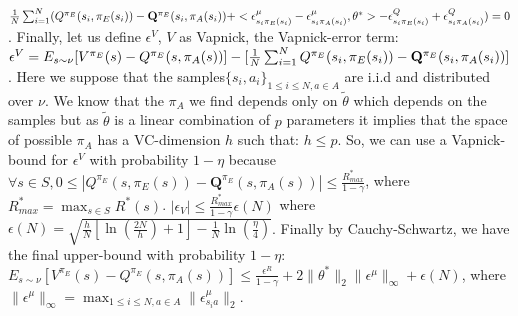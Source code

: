 \documentclass{article}
\newcommand{\Q}{\mathbf{Q}}
\begin{document}
${1\over N}\sum_{i=1}^N(Q^{\pi_E}(s_i,\pi_E(s_i))-\Q^{\pi_E}(s_i,\pi_A(s_i))+<\epsilon^{\mu}_{s_i\pi_E(s_i)}-\epsilon^{\mu}_{s_i\pi_A(s_i)},\theta^*>-\epsilon^{Q}_{s_i\pi_E(s_i)}+\epsilon^{Q}_{s_i\pi_A(s_i)})=0$. Finally, let us define $\epsilon^V$, $V$ as Vapnick, the Vapnick-error term:
$\epsilon^V=E_{s\sim\nu}[V^{\pi_E}(s)-Q^{\pi_E}(s,\pi_A(s))]-[{1\over N}\sum_{i=1}^NQ^{\pi_E}(s_i,\pi_E(s_i))-\Q^{\pi_E}(s_i,\pi_A(s_i))]$. Here we suppose that the samples$\{s_i,a_i\}_{1\leq i \leq N,a\in A}$ are i.i.d and distributed over $\nu$. We know that the $\pi_A$ we find depends only on $\tilde{\theta}$ which depends on the samples
but as $\tilde{\theta}$ is a linear combination of $p$ parameters it implies that the space of possible $\pi_A$ has a VC-dimension $h$ such that: $h\leq p$. So, we can use a Vapnick-bound for $\epsilon^V$ with probability $1-\eta$ because $\forall s\in S, 0\leq|Q^{\pi_E}(s,\pi_E(s))-\Q^{\pi_E}(s,\pi_A(s))|\leq\frac{R^*_{max}}{1-\gamma}$, where $R^*_{max}=\max_{s\in S}R^*(s)$. 
$|\epsilon_V|\leq\frac{R^*_{max}}{1-\gamma}\epsilon(N)$ where $\epsilon(N)=\sqrt{\frac{h}{N}[\ln(\frac{2N}{h})+1]-\frac{1}{N}\ln(\frac{\eta}{4})}$. Finally by Cauchy-Schwartz, we have the final upper-bound with probability $1-\eta$:
$E_{s\sim\nu}[V^{\pi_E}(s)-Q^{\pi_E}(s,\pi_A(s))]\leq\frac{\epsilon^R}{1-\gamma}+2\|\theta^*\|_2\|\epsilon^{\mu}\|_{\infty}+\epsilon(N)$, where $\|\epsilon^{\mu}\|_{\infty}=\max_{1\leq i\leq N,a\in A}\|\epsilon^{\mu}_{s_ia}\|_2$. 
\end{document}
